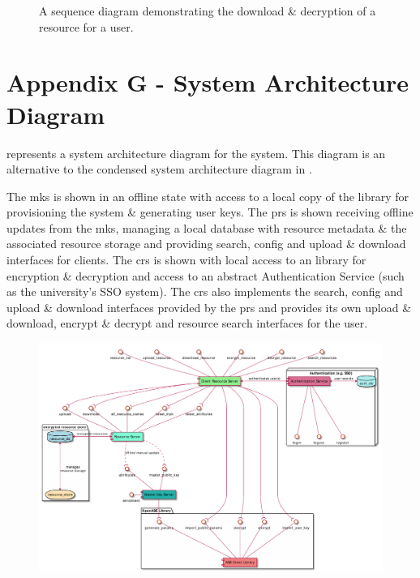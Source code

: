 \begin{appendices}
\begin{figure}[htp]
    \caption{A sequence diagram demonstrating the download \& decryption of a resource for a user.}

\end{figure}

\clearpage

\section{Appendix G - System Architecture Diagram}
\label{appendix:architecture_diagram}

 represents a system architecture diagram for the \theResServer system. This diagram is an alternative to the condensed system architecture diagram in .

The \acrfull{mks} is shown in an offline state with access to a local copy of the \OpenABE library for provisioning the system \& generating user keys. The \acrfull{prs} is shown receiving offline updates from the \acrshort{mks}, managing a local database with resource metadata \& the associated resource storage and providing search, config and upload \& download interfaces for clients. The \acrfull{crs} is shown with local access to an \OpenABE library for encryption \& decryption and access to an abstract Authentication Service (such as the university's SSO system). The \acrshort{crs} also implements the search, config and upload \& download interfaces provided by the \acrshort{prs} and provides its own upload \& download, encrypt \& decrypt and resource search interfaces for the user.

\begin{figure}[htp]
    \centering
    \label{fig:appendix_sys_arch_full}
    \includegraphics[width=\linewidth,keepaspectratio]{appendices/diagrams/infrastructure/system_architecture.pdf}


\end{figure}
\end{appendices}
